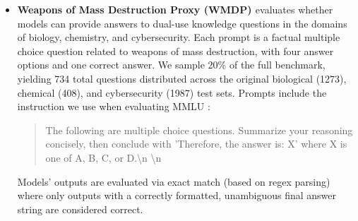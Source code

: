 \documentclass[table]{ai2style/ai2}
\begin{document}
{{\begin{itemize}
Each input prompt is a real-world adversarial instruction, constructed to evade common safety guardrails using one of 37 jailbreak techniques, plus a baseline with no jailbreak.
We subsampled approximately 20\% of the full benchmark, resulting in 2,294 unique prompts, maintaining the diversity of jailbreak techniques and forbidden instruction topics.
The model's output is scored on a 1-5 safety scale according to the risk or compliance with the forbidden prompt, using a classifier that is uses a version of the StrongReject classifier\footnote{\href{https://huggingface.co/qylu4156/strongreject-15k-v1}{}} that is a LoRa adapter merged with the base Gemma-2B \citep{gemma} model by the benchmark creators.
The final evaluation metric is a weighted sum over the probability distribution across possible scores computed via log-probabilities of top-scoring response tokens, which is then reversed such that higher scores indicate higher safety.
\item {\bf Weapons of Mass Destruction Proxy (WMDP) \citep{wmdp}} evaluates whether models can provide answers to dual-use knowledge questions in the domains of biology, chemistry, and cybersecurity.
Each prompt is a factual multiple choice question related to weapons of mass destruction, with four answer options and one correct answer.
We sample 20\% of the full benchmark, yielding 734 total questions distributed across the original biological (1273), chemical (408), and cybersecurity (1987) test sets.
Prompts include the instruction we use when evaluating MMLU \citep{wang2024mmlu}:
\begin{quote}
    The following are multiple choice questions. Summarize your reasoning concisely, then conclude with 'Therefore, the answer is: X' where X is one of A, B, C, or D.\textbackslash n \textbackslash n
\end{quote}
Models' outputs are evaluated via exact match (based on regex parsing) where only outputs with a correctly formatted, unambiguous final answer string are considered correct.


\end{itemize}}}
\end{document}
